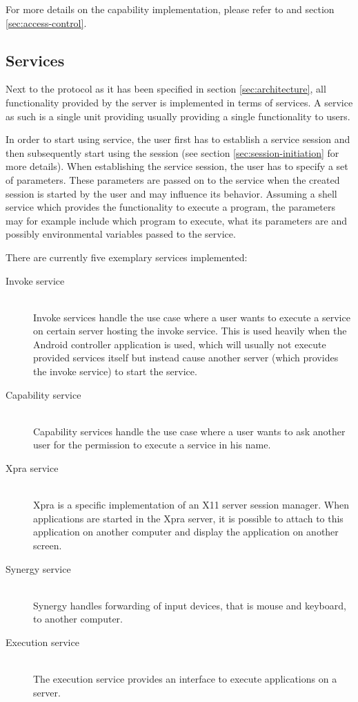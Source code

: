 For more details on the capability implementation, please refer to \cite{gong1989secure} and section \ref{sec:access-control}.

\subsection{Services}
\label{sec:services}

Next to the protocol as it has been specified in section \ref{sec:architecture}, all functionality provided by the server is implemented in terms of services.
A service as such is a single unit providing usually providing a single functionality to users.

In order to start using service, the user first has to establish a service session and then subsequently start using the session (see section \ref{sec:session-initiation} for more details).
When establishing the service session, the user has to specify a set of parameters.
These parameters are passed on to the service when the created session is started by the user and may influence its behavior.
Assuming a shell service which provides the functionality to execute a program, the parameters may for example include which program to execute, what its parameters are and possibly environmental variables passed to the service.

There are currently five exemplary services implemented:
\begin{description}
    \item[Invoke service]\hfill\\
        Invoke services handle the use case where a user wants to execute a service on certain server hosting the invoke service.
        This is used heavily when the Android controller application is used, which will usually not execute provided services itself but instead cause another server (which provides the invoke service) to start the service.
    \item[Capability service]\hfill\\
        Capability services handle the use case where a user wants to ask another user for the permission to execute a service in his name.
    \item[Xpra service]\hfill\\
        Xpra is a specific implementation of an X11 server session manager.
        When applications are started in the Xpra server, it is possible to attach to this application on another computer and display the application on another screen.
    \item[Synergy service]\hfill\\
        Synergy handles forwarding of input devices, that is mouse and keyboard, to another computer.
    \item[Execution service]\hfill\\
        The execution service provides an interface to execute applications on a server.
\end{description}

